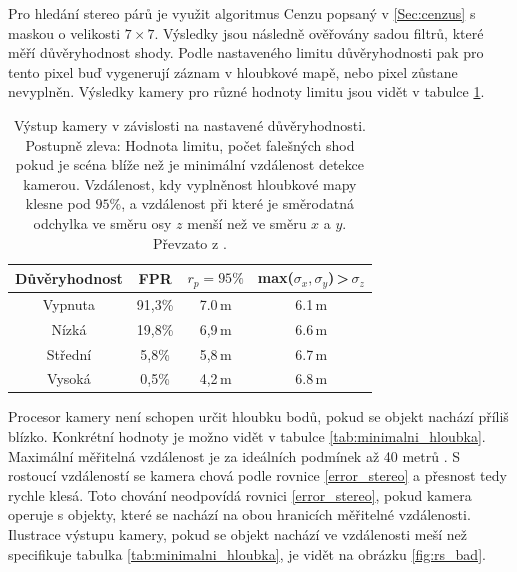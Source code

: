 \documentclass[twoside]{ctuthesis}
\begin{document}
    Pro hledání stereo párů je využit algoritmus Cenzu popsaný v \ref{Sec:cenzus} s maskou o velikosti $7 \times 7 $. Výsledky jsou následně ověřovány sadou filtrů, které měří důvěryhodnost shody. Podle nastaveného limitu důvěryhodnosti pak pro tento pixel buď vygenerují záznam v hloubkové mapě, nebo pixel zůstane nevyplněn. Výsledky kamery pro různé hodnoty limitu jsou vidět v tabulce \ref{tab:tablka_limity}. 
\begin{table}[h]
    \centering
    \begin{tabular}{|c|c|c|c|} \hline
        Důvěryhodnost & FPR & $r_p = 95\%$ & max($\sigma_x,\sigma_y$)\,>\,$\sigma_z$ \\ \hline \hline
        Vypnuta & 91,3\% & 7.0\,m & 6.1\,m \\ \hline
        Nízká & 19,8\% & 6,9\,m & 6.6\,m \\ \hline
        Střední & 5,8\% & 5,8\,m & 6.7\,m \\ \hline
        Vysoká & 0,5\% & 4,2\,m & 6.8\,m \\ \hline
    \end{tabular}
    \caption[Výstup kamery v závislosti na nastavené důvěryhodnosti]{Výstup kamery v závislosti na nastavené důvěryhodnosti. Postupně zleva: Hodnota limitu, počet falešných shod pokud je scéna blíže než je minimální vzdálenost detekce kamerou. Vzdálenost, kdy vyplněnost hloubkové mapy klesne pod $95\%$, a vzdálenost při které je směrodatná odchylka ve směru osy $z$ menší než ve směru $x$ a $y$. Převzato z \cite{keselman2017intel}.}
    \label{tab:tablka_limity}
\end{table}

Procesor kamery není schopen určit hloubku bodů, pokud se objekt nachází příliš blízko. Konkrétní hodnoty je možno vidět v tabulce \ref{tab:minimalni_hloubka}. Maximální měřitelná vzdálenost je za ideálních podmínek až 40 metrů \cite{keselman2017intel}. S rostoucí vzdáleností se kamera chová podle rovnice \ref{error_stereo} a přesnost tedy rychle klesá. Toto chování neodpovídá rovnici \ref{error_stereo}, pokud kamera operuje s objekty, které se nachází na obou hranicích měřitelné vzdálenosti. Ilustrace výstupu kamery, pokud se objekt nachází ve vzdálenosti meší než specifikuje tabulka \ref{tab:minimalni_hloubka}, je vidět na obrázku \ref{fig:rs_bad}.

\end{document}
